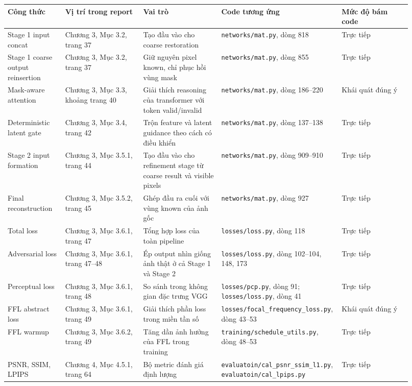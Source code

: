 \documentclass[12pt,a4paper]{article}
\begin{document}
\begin{longtable}{p{0.14\linewidth} p{0.19\linewidth} p{0.19\linewidth} p{0.23\linewidth} p{0.17\linewidth}}
\toprule
\textbf{Công thức} & \textbf{Vị trí trong report} & \textbf{Vai trò} & \textbf{Code tương ứng} & \textbf{Mức độ bám code} \\
\midrule
\endhead
Stage 1 input concat & Chương 3, Mục 3.2, trang 37 & Tạo đầu vào cho coarse restoration & \texttt{networks/mat.py}, dòng 818 & Trực tiếp \\
Stage 1 coarse output reinsertion & Chương 3, Mục 3.2, trang 37 & Giữ nguyên pixel known, chỉ phục hồi vùng mask & \texttt{networks/mat.py}, dòng 855 & Trực tiếp \\
Mask-aware attention & Chương 3, Mục 3.3, khoảng trang 40 & Giải thích reasoning của transformer với token valid/invalid & \texttt{networks/mat.py}, dòng 186--220 & Khái quát đúng ý \\
Deterministic latent gate & Chương 3, Mục 3.4, trang 42 & Trộn feature và latent guidance theo cách có điều khiển & \texttt{networks/mat.py}, dòng 137--138 & Trực tiếp \\
Stage 2 input formation & Chương 3, Mục 3.5.1, trang 44 & Tạo đầu vào cho refinement stage từ coarse result và visible pixels & \texttt{networks/mat.py}, dòng 909--910 & Trực tiếp \\
Final reconstruction & Chương 3, Mục 3.5.2, trang 45 & Ghép đầu ra cuối với vùng known của ảnh gốc & \texttt{networks/mat.py}, dòng 927 & Trực tiếp \\
Total loss & Chương 3, Mục 3.6.1, trang 47 & Tổng hợp loss của toàn pipeline & \texttt{losses/loss.py}, dòng 118 & Trực tiếp \\
Adversarial loss & Chương 3, Mục 3.6.1, trang 47--48 & Ép output nhìn giống ảnh thật ở cả Stage 1 và Stage 2 & \texttt{losses/loss.py}, dòng 102--104, 148, 173 & Trực tiếp \\
Perceptual loss & Chương 3, Mục 3.6.1, trang 48 & So sánh trong không gian đặc trưng VGG & \texttt{losses/pcp.py}, dòng 91; \texttt{losses/loss.py}, dòng 41 & Trực tiếp \\
FFL abstract loss & Chương 3, Mục 3.6.1, trang 49 & Giải thích phần loss trong miền tần số & \texttt{losses/focal\_frequency\_loss.py}, dòng 43--53 & Khái quát đúng ý \\
FFL warmup & Chương 3, Mục 3.6.2, trang 49 & Tăng dần ảnh hưởng của FFL trong training & \texttt{training/schedule\_utils.py}, dòng 48--53 & Trực tiếp \\
PSNR, SSIM, LPIPS & Chương 4, Mục 4.5.1, trang 64 & Bộ metric đánh giá định lượng & \texttt{evaluatoin/cal\_psnr\_ssim\_l1.py}, \texttt{evaluatoin/cal\_lpips.py} & Trực tiếp \\
\bottomrule
\end{longtable}
\end{document}
